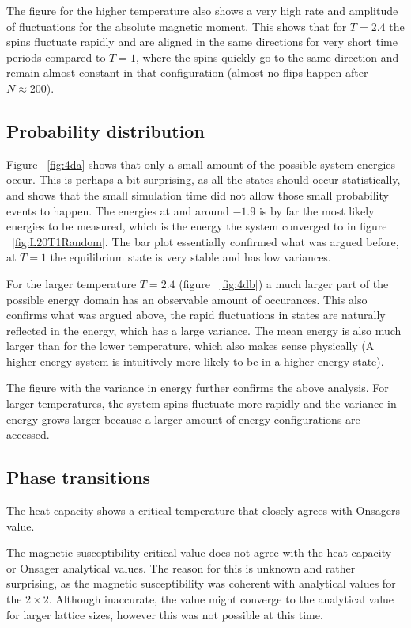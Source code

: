 \documentclass[aps,reprint]{revtex4-1}
\begin{document}
The figure for the higher temperature also shows a very high rate and amplitude
of fluctuations for the absolute magnetic moment. This shows that for $T = 2.4$
the spins fluctuate rapidly and are aligned in the same directions for very short
time periods compared to $T = 1$, where the spins quickly go to the same direction
and remain almost constant in that configuration (almost no flips happen after
$N \approx 200$).

\subsection{Probability distribution}
Figure ~\ref{fig:4da} shows that only a small amount of the possible system energies occur.
This is perhaps a bit surprising, as all the states should occur statistically,
and shows that the small simulation time did not allow those small probability events to
happen. The energies at and around $-1.9$ is by far the most likely energies to be measured,
which is the energy the system converged to in figure ~\ref{fig:L20T1Random}. The
bar plot essentially confirmed what was argued before, at $T = 1$ the equilibrium state
is very stable and has low variances.

For the larger temperature $T = 2.4$ (figure ~\ref{fig:4db}) a much larger part of
the possible energy domain has an observable amount of occurances. This also confirms
what was argued above, the rapid fluctuations in states are naturally reflected in the
energy, which has a large variance. The mean energy is also much larger than for the lower
temperature, which also makes sense physically (A higher energy system is intuitively
more likely to be in a higher energy state).

The figure with the variance in energy further confirms the above analysis. For
larger temperatures, the system spins fluctuate more rapidly and the variance in energy
grows larger because a larger amount of energy configurations are accessed.

\subsection{Phase transitions}
The heat capacity shows a critical temperature that closely agrees with Onsagers
value.

The magnetic susceptibility critical value does not agree with the heat capacity
or Onsager analytical values. The reason for this is unknown and rather surprising,
as the magnetic susceptibility was coherent with analytical values for the $2 \times 2$.
Although inaccurate, the value might converge to the analytical value for larger
lattice sizes, however this was not possible at this time.
\end{document}
